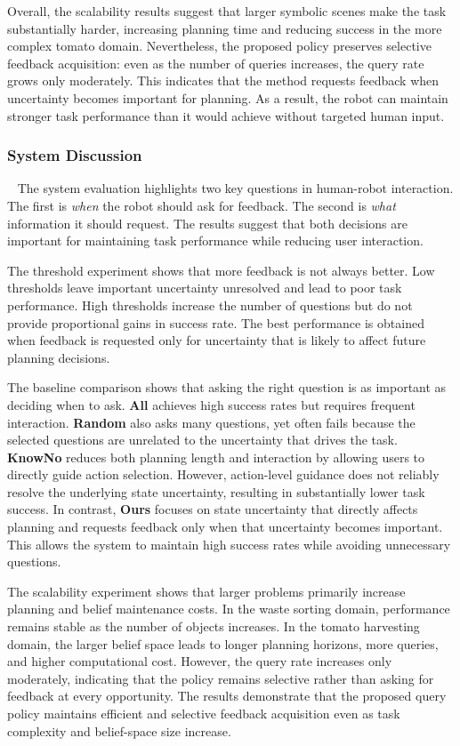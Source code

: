 Overall, the scalability results suggest that larger symbolic scenes make the task substantially harder, increasing planning time and reducing success in the more complex tomato domain. Nevertheless, the proposed policy preserves selective feedback acquisition: even as the number of queries increases, the query rate grows only moderately. This indicates that the method requests feedback when uncertainty becomes important for planning. As a result, the robot can maintain stronger task performance than it would achieve without targeted human input.


\subsubsection{System Discussion}~\label{exp:sys_discuss}
The system evaluation highlights two key questions in human-robot interaction. The first is \textit{when} the robot should ask for feedback. The second is \textit{what} information it should request. The results suggest that both decisions are important for maintaining task performance while reducing user interaction.

The threshold experiment shows that more feedback is not always better. Low thresholds leave important uncertainty unresolved and lead to poor task performance. High thresholds increase the number of questions but do not provide proportional gains in success rate. The best performance is obtained when feedback is requested only for uncertainty that is likely to affect future planning decisions.

The baseline comparison shows that asking the right question is as important as deciding when to ask. \textbf{All} achieves high success rates but requires frequent interaction. \textbf{Random} also asks many questions, yet often fails because the selected questions are unrelated to the uncertainty that drives the task. \textbf{KnowNo} reduces both planning length and interaction by allowing users to directly guide action selection. However, action-level guidance does not reliably resolve the underlying state uncertainty, resulting in substantially lower task success. In contrast, \textbf{Ours} focuses on state uncertainty that directly affects planning and requests feedback only when that uncertainty becomes important. This allows the system to maintain high success rates while avoiding unnecessary questions.

The scalability experiment shows that larger problems primarily increase planning and belief maintenance costs. In the waste sorting domain, performance remains stable as the number of objects increases. In the tomato harvesting domain, the larger belief space leads to longer planning horizons, more queries, and higher computational cost. However, the query rate increases only moderately, indicating that the policy remains selective rather than asking for feedback at every opportunity. The results demonstrate that the proposed query policy maintains efficient and selective feedback acquisition even as task complexity and belief-space size increase.

